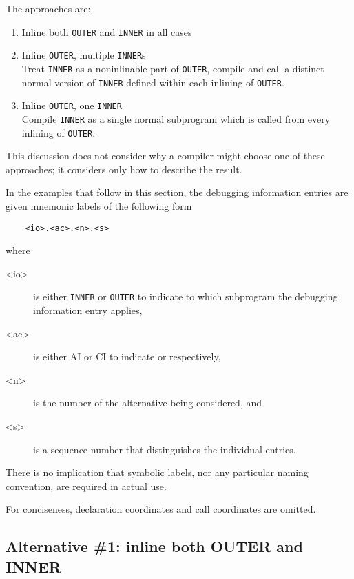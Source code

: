 The approaches are:
\begin{enumerate}[1. ]
\item  Inline both \texttt{OUTER} and \texttt{INNER} in all cases

\item Inline \texttt{OUTER}, multiple \texttt{INNER}s \\
Treat \texttt{INNER} as a non\dash inlinable part of \texttt{OUTER}, compile and
call a distinct normal version of \texttt{INNER} defined within each
inlining of \texttt{OUTER}.

\item Inline \texttt{OUTER}, one \texttt{INNER} \\
Compile \texttt{INNER} as a single normal subprogram which is called
from every inlining of \texttt{OUTER}.
\end{enumerate}

This discussion does not consider why a compiler might choose
one of these approaches; it considers only how to describe
the result.

In the examples that follow in this section, the debugging
information entries are given mnemonic labels of the following
form
\begin{verbatim}
    <io>.<ac>.<n>.<s>
\end{verbatim}
where
\begin{description}
\item[\textless io\textgreater]
is either \texttt{INNER} or \texttt{OUTER} to indicate to which
subprogram the debugging information entry applies, 
\item[\textless ac\textgreater]
is either AI or CI to indicate  or
 respectively, 
\item[\textless n\textgreater]
is the number of the
alternative being considered, and 
\item[\textless s\textgreater]
is a sequence number that
distinguishes the individual entries. 
\end{description}
There is no implication
that symbolic labels, nor any particular naming convention,
are required in actual use.

For conciseness, declaration coordinates and call coordinates are omitted.

\subsection{Alternative \#1: inline both OUTER and INNER}
\label{app:inlinebothouterandinner}

